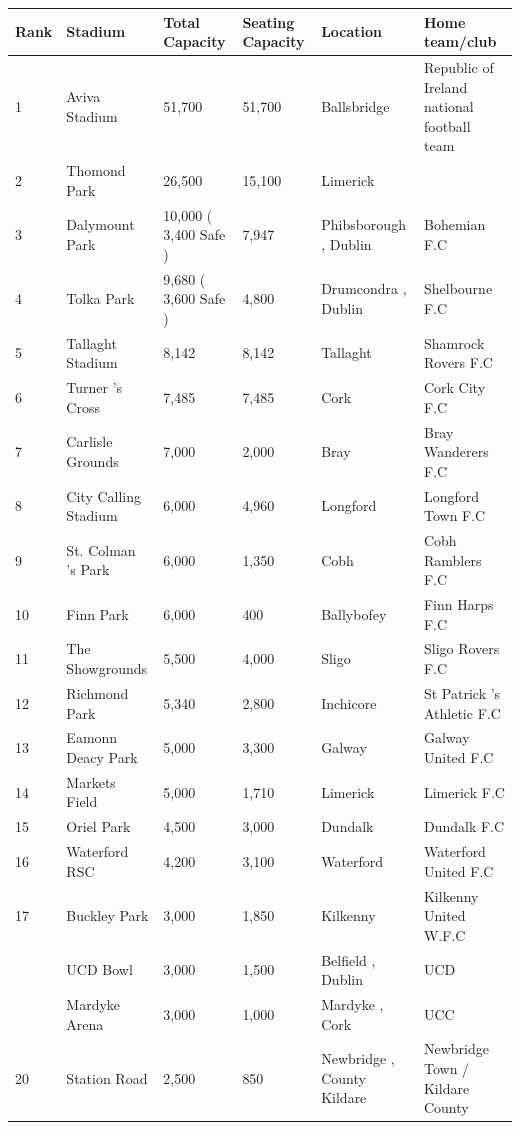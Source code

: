 \documentclass{article}
\begin{document}
\begin{tabular}{llllll}
\toprule
Rank & Stadium & Total Capacity & Seating Capacity & Location & Home team/club \\
\midrule
1 & Aviva Stadium & 51,700 & 51,700 & Ballsbridge & Republic of Ireland national football team \\
2 & Thomond Park & 26,500 & 15,100 & Limerick &  \\
3 & Dalymount Park & 10,000 ( 3,400 Safe ) & 7,947 & Phibsborough , Dublin & Bohemian F.C \\
4 & Tolka Park & 9,680 ( 3,600 Safe ) & 4,800 & Drumcondra , Dublin & Shelbourne F.C \\
5 & Tallaght Stadium & 8,142 & 8,142 & Tallaght & Shamrock Rovers F.C \\
6 & Turner 's Cross & 7,485 & 7,485 & Cork & Cork City F.C \\
7 & Carlisle Grounds & 7,000 & 2,000 & Bray & Bray Wanderers F.C \\
8 & City Calling Stadium & 6,000 & 4,960 & Longford & Longford Town F.C \\
9 & St. Colman 's Park & 6,000 & 1,350 & Cobh & Cobh Ramblers F.C \\
10 & Finn Park & 6,000 & 400 & Ballybofey & Finn Harps F.C \\
11 & The Showgrounds & 5,500 & 4,000 & Sligo & Sligo Rovers F.C \\
12 & Richmond Park & 5,340 & 2,800 & Inchicore & St Patrick 's Athletic F.C \\
13 & Eamonn Deacy Park & 5,000 & 3,300 & Galway & Galway United F.C \\
14 & Markets Field & 5,000 & 1,710 & Limerick & Limerick F.C \\
15 & Oriel Park & 4,500 & 3,000 & Dundalk & Dundalk F.C \\
16 & Waterford RSC & 4,200 & 3,100 & Waterford & Waterford United F.C \\
17 & Buckley Park & 3,000 & 1,850 & Kilkenny & Kilkenny United W.F.C \\
 & UCD Bowl & 3,000 & 1,500 & Belfield , Dublin & UCD \\
 & Mardyke Arena & 3,000 & 1,000 & Mardyke , Cork & UCC \\
20 & Station Road & 2,500 & 850 & Newbridge , County Kildare & Newbridge Town / Kildare County \\
\bottomrule
\end{tabular}
\end{document}
